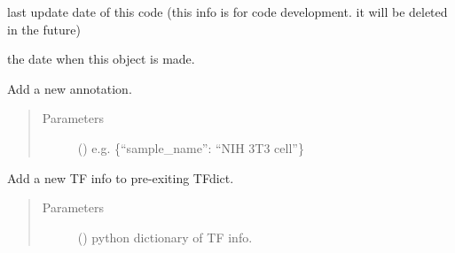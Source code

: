 \documentclass[letterpaper,10pt,english]{sphinxmanual}
\begin{document}
\begin{fulllineitems}
\begin{fulllineitems}
\end{fulllineitems}


\begin{fulllineitems}
\label{\detokenize{modules/celloracle:celloracle.Net.library_last_update_date}}
 \textendash{} last update date of this code (this info is for code development. it will be deleted in the future)

\end{fulllineitems}


\begin{fulllineitems}
\label{\detokenize{modules/celloracle:celloracle.Net.object_initiation_date}}
 \textendash{} the date when this object is made.

\end{fulllineitems}


\begin{fulllineitems}
\label{\detokenize{modules/celloracle:celloracle.Net.addAnnotation}}
Add a new annotation.
\begin{quote}\begin{description}
\item[{Parameters}] \leavevmode
{} () \textendash{} e.g. \{“sample\_name”: “NIH 3T3 cell”\}

\end{description}\end{quote}

\end{fulllineitems}


\begin{fulllineitems}
\label{\detokenize{modules/celloracle:celloracle.Net.addTFinfo_dictionary}}
Add a new TF info to pre-exiting TFdict.
\begin{quote}\begin{description}
\item[{Parameters}] \leavevmode
{} () \textendash{} python dictionary of TF info.


\end{description}
\end{quote}
\end{fulllineitems}
\end{fulllineitems}
\end{document}
